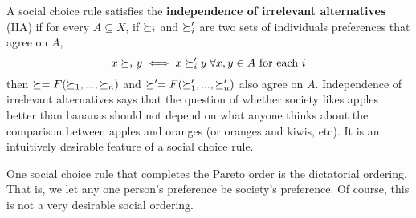 A social choice rule satisfies the \textbf{independence of irrelevant
  alternatives} (IIA) if for every $A \subseteq X$, if $\succeq_i$ and
$\succeq_i'$ are two sets of individuals preferences that agree on $A$,
\[ x \succeq_i y \iff x \succeq_i' y \; \forall x,y \in A \text{ for each
} i\] 
then $\succeq=F(\succeq_1, ..., \succeq_n)$ and $\succeq'=F(\succeq_1', ...,
\succeq_n')$ also agree on $A$. Independence 
of irrelevant alternatives says that the question of whether society
likes apples better than bananas should not depend on what anyone
thinks about the comparison between apples and oranges (or oranges and
kiwis, etc). It is an intuitively desirable feature of a social
choice rule.

One social choice rule that completes the Pareto order is the
dictatorial ordering. That is, we let any one person's preference be
society's preference. Of course, this is not a very desirable social
ordering.

